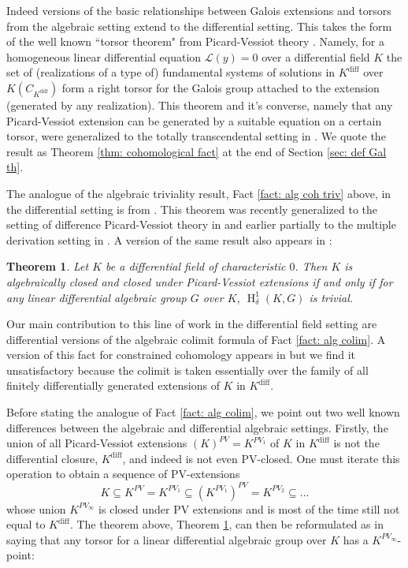 \documentclass{amsart}
\newtheorem{theorem}{Theorem}[section]
\theoremstyle{definition}
\theoremstyle{remark}
\numberwithin{equation}{section}
\def \HH {\operatorname{H}}
\def \diff {\operatorname{diff}}
\begin{document}
Indeed versions of the basic relationships between Galois extensions and torsors from the algebraic setting extend to the differential setting. This takes the form of the well known ``torsor theorem" from Picard-Vessiot theory \cite{vdPS2003}. Namely, for a homogeneous linear differential equation $\mathcal{L}(y) = 0$ over a differential field $K$ the set of (realizations of a type of) fundamental systems of solutions in $K^{\diff}$ over $K(C_{K^{\diff}})$ form a right torsor for the Galois group attached to the extension (generated by any realization). This theorem and it's converse, namely that any Picard-Vessiot extension can be generated by a suitable equation on a certain torsor, were generalized to the totally transcendental setting in \cite{OmarDavid2026}. We quote the result as Theorem \ref{thm: cohomological fact} at the end of Section \ref{sec: def Gal th}. 

The analogue of the algebraic triviality result, Fact \ref{fact: alg coh triv} above, in the differential setting is from \cite{PILLAY2017809}. This theorem was recently generalized to the setting of difference Picard-Vessiot theory in \cite{Bachmayr_Wibmer_2026} and earlier partially to the multiple derivation setting in \cite{Chatzidakis2017GeneralizedPE}. A version of the same result also appears in \cite{Minchenko_2019}:

\begin{theorem}\label{thm: diff triviality}\cite{PILLAY2017809}
    Let $K$ be a differential field of characteristic $0$. Then $K$ is algebraically closed and closed under Picard-Vessiot extensions if and only if for any linear differential algebraic group $G$ over $K$, 
    $\HH_{\delta}^{1}(K,G)$ is trivial.
\end{theorem}

Our main contribution to this line of work in the differential field setting are differential versions of the algebraic colimit formula of Fact \ref{fact: alg colim}. A version of this fact for constrained cohomology appears in \cite{kolchin1985differential} but we find it unsatisfactory because the colimit is taken essentially over the family of all finitely differentially generated extensions of $K$ in $K^{\diff}$. 

Before stating the analogue of Fact \ref{fact: alg colim}, we point out two well known differences between the algebraic and differential algebraic settings. Firstly, the union of all Picard-Vessiot extensions $(K)^{PV} = K^{PV_{1}}$ of $K$ in $K^{\diff}$ is not the differential closure, $K^{\diff}$, and indeed is not even PV-closed. One must iterate this operation to obtain a sequence of PV-extensions $$K \subseteq K^{PV} = K^{PV_1} \subseteq (K^{PV_1})^{PV} = K^{PV_2} \subseteq ... $$ whose union $K^{PV_\infty}$ is closed under PV extensions and is most of the time still not equal to $K^{\diff}$. The theorem above, Theorem \ref{thm: diff triviality}, can then be reformulated as in \cite{AnandDavidComm} saying that any torsor for a linear differential algebraic group over $K$ has a $K^{PV_{\infty}}$-point:
\end{document}
